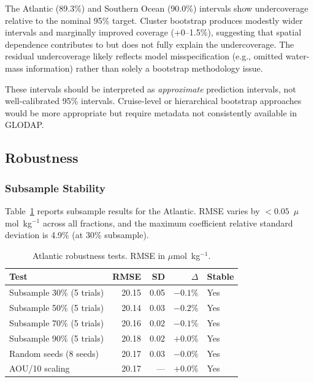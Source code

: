 \documentclass[12pt,a4paper]{article}
\begin{document}
The Atlantic (89.3\%) and Southern Ocean (90.0\%) intervals show undercoverage relative to the nominal 95\% target. Cluster bootstrap produces modestly wider intervals and marginally improved coverage (+0--1.5\%), suggesting that spatial dependence contributes to but does not fully explain the undercoverage. The residual undercoverage likely reflects model misspecification (e.g., omitted water-mass information) rather than solely a bootstrap methodology issue.

These intervals should be interpreted as \emph{approximate} prediction intervals, not well-calibrated 95\% intervals. Cruise-level or hierarchical bootstrap approaches would be more appropriate but require metadata not consistently available in GLODAP.

\subsection{Robustness}
\label{sec:robustness_results}

\subsubsection{Subsample Stability}

Table~\ref{tab:robustness} reports subsample results for the Atlantic. RMSE varies by $<0.05$~$\mu$mol~kg$^{-1}$ across all fractions, and the maximum coefficient relative standard deviation is 4.9\% (at 30\% subsample).

\begin{table}[htbp]
\centering
\caption{Atlantic robustness tests. RMSE in $\mu$mol~kg$^{-1}$.}
\label{tab:robustness}
\begin{tabular}{lrrrl}
\toprule
\textbf{Test} & RMSE & SD & $\Delta$ & \textbf{Stable} \\
\midrule
Subsample 30\% (5 trials) & 20.15 & 0.05 & $-0.1\%$ & Yes \\
Subsample 50\% (5 trials) & 20.14 & 0.03 & $-0.2\%$ & Yes \\
Subsample 70\% (5 trials) & 20.16 & 0.02 & $-0.1\%$ & Yes \\
Subsample 90\% (5 trials) & 20.18 & 0.02 & $+0.0\%$ & Yes \\
Random seeds (8 seeds)    & 20.17 & 0.03 & $-0.0\%$ & Yes \\
AOU/10 scaling            & 20.17 & ---  & $+0.0\%$ & Yes \\
\bottomrule
\end{tabular}
\end{table}
\end{document}
